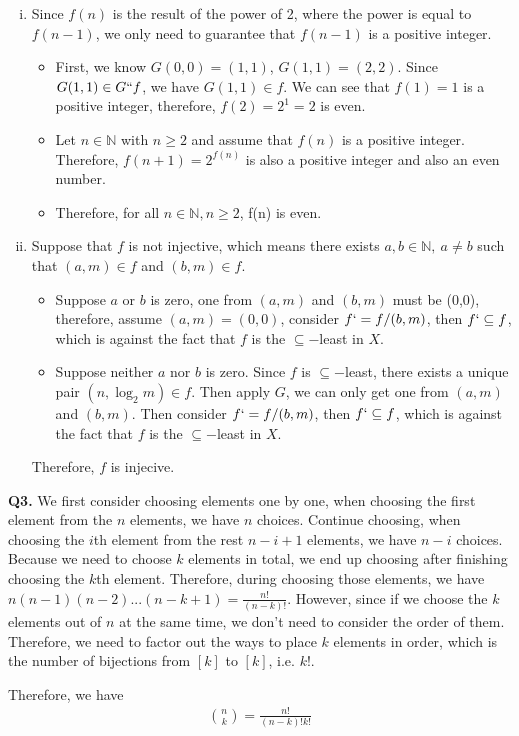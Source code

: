 \documentclass{article}[12pt]
\begin{document}
\begin{enumerate}[(i)]
\item Since $ f(n) $ is the result of the power of 2, where the power is equal to $f(n-1)$, we only need to guarantee that $f(n-1)$ is a positive integer. 
\begin{itemize}
\item First, we know $G(0,0)=(1,1)$, $G(1,1)=(2,2)$. Since $G(1,1)\in G``f$, we have $G(1,1)\in f$. We can see that $f(1)=1$ is a positive integer, therefore, $f(2)=2^1=2$ is even.
\item Let $n\in \mathbb{N}$ with $n\geq 2$ and assume that $f(n)$ is a positive integer. Therefore, $f(n+1)=2^{f(n)}$ is also a positive integer and also an even number. 
\item Therefore, for all $n\in \mathbb{N}, n\geq 2$, f(n) is even.
\end{itemize}
\item Suppose that $f$ is not injective, which means there exists $a,b\in \mathbb{N},\ a\not=b$ such that $(a,m)\in f$ and $(b,m)\in f$. 
\begin{itemize}
\item Suppose $a$ or $b$ is zero, one from $(a,m)$ and $(b,m)$ must be (0,0), therefore, assume $(a,m)=(0,0)$, consider $f`=f/(b,m)$, then $f`\subseteq f$, which is against the fact that $f$ is the $\subseteq-$least in $X$.
\item Suppose neither $a$ nor $b$ is zero. Since $f$ is $\subseteq-$least, there exists a unique pair $(n,\log_2m)\in f$. Then apply $G$, we can only get one from $(a,m)$ and $(b,m)$. Then consider $f`=f/(b,m)$, then $f`\subseteq f$, which is against the fact that $f$ is the $\subseteq-$least in $X$.
\end{itemize}
Therefore, $f$ is injecive.
\end{enumerate}

\noindent \textbf{Q3.}
We first consider choosing elements one by one, when choosing the first element from the $n$ elements, we have $n$ choices. Continue choosing, when choosing the $i$th element from the rest $n-i+1$ elements, we have $n-i$ choices. Because we need to choose $k$ elements in total, we end up choosing after finishing choosing the $k$th element. Therefore, during choosing those elements, we have $n(n-1)(n-2)...(n-k+1)=\frac{n!}{(n-k)!}$. However, since if we choose the $k$ elements out of $n$ at the same time, we don't need to consider the order of them. Therefore, we need to factor out the ways to place $k$ elements in order, which is the number of bijections from $[k]$ to $[k]$, i.e. $k!$.\par
Therefore, we have 
\begin{align*}
\binom{n}{k}	=\frac{n!}{(n-k)!k!}
\end{align*}
\end{document}
